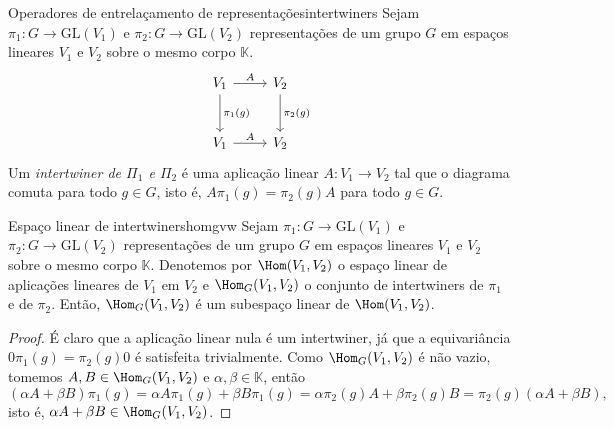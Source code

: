 \begin{definition}{Operadores de entrelaçamento de representações}{intertwiners}
    Sejam \(\pi_1 : G \to \mathrm{GL}(V_1)\) e \(\pi_2 : G \to \mathrm{GL}(V_2)\) representações de um grupo \(G\) em espaços lineares \(V_1\) e \(V_2\) sobre o mesmo corpo \(\mathbb{K}\).
    \begin{equation*}
        \begin{tikzcd}[column sep = normal, row sep = large]
            V_1 \arrow{r}{A} \arrow{d}{\pi_1(g)} & V_2 \arrow{d}{\pi_2(g)}\\
            V_1 \arrow{r}{A} & V_2
        \end{tikzcd}
    \end{equation*}
    Um \emph{intertwiner de \(\Pi_1\) e \(\Pi_2\)} é uma aplicação linear \(A : V_1 \to V_2\) tal que o diagrama comuta para todo \(g \in G\), isto é, \(A\pi_1(g) = \pi_2(g)A\) para todo \(g \in G\).
\end{definition}
\begin{proposition}{Espaço linear de intertwiners}{homgvw}
    Sejam \(\pi_1 : G \to \mathrm{GL}(V_1)\) e \(\pi_2 : G \to \mathrm{GL}(V_2)\) representações de um grupo \(G\) em espaços lineares \(V_1\) e \(V_2\) sobre o mesmo corpo \(\mathbb{K}\). Denotemos por \(\Hom(V_1, V_2)\) o espaço linear de aplicações lineares de \(V_1\) em \(V_2\) e \(\Hom_G(V_1, V_2)\) o conjunto de intertwiners de \(\pi_1\) e de \(\pi_2\). Então, \(\Hom_G(V_1, V_2)\) é um subespaço linear de \(\Hom(V_1, V_2)\).
\end{proposition}
\begin{proof}
    É claro que a aplicação linear nula é um intertwiner, já que a equivariância \(0 \pi_1(g) = \pi_2(g) 0\) é satisfeita trivialmente. Como \(\Hom_G(V_1, V_2)\) é não vazio, tomemos \(A, B \in \Hom_G(V_1, V_2)\) e \(\alpha, \beta \in \mathbb{K}\), então
    \begin{equation*}
        (\alpha A + \beta B)\pi_1(g) = \alpha A \pi_1(g) + \beta B \pi_1(g) = \alpha \pi_2(g)A + \beta \pi_2(g) B = \pi_2(g) (\alpha A + \beta B),
    \end{equation*}
    isto é, \(\alpha A + \beta B \in \Hom_G(V_1, V_2)\).
\end{proof}


